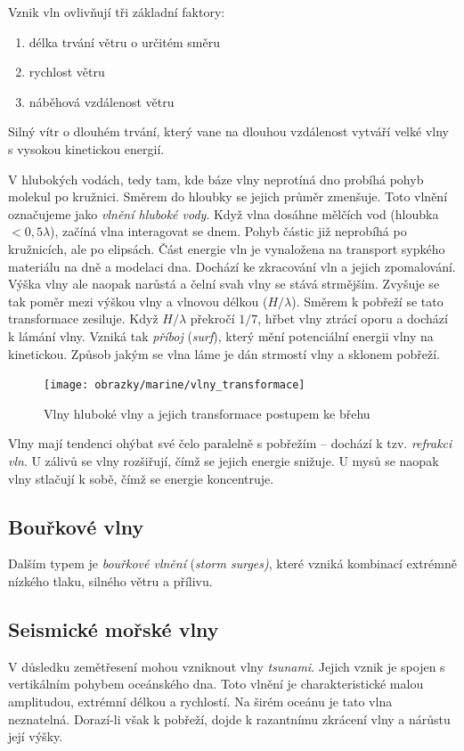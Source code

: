 Vznik vln ovlivňují tři základní faktory:
\begin{enumerate}
	\item délka trvání větru o určitém směru
	\item rychlost větru
	\item náběhová vzdálenost větru
\end{enumerate}

Silný vítr o dlouhém trvání, který vane na dlouhou vzdálenost vytváří velké vlny s vysokou kinetickou energií. 

V hlubokých vodách, tedy tam, kde báze vlny neprotíná dno probíhá pohyb molekul po kružnici. Směrem do hloubky se jejich průměr zmenšuje. Toto vlnění označujeme jako \emph{vlnění hluboké vody}. Když vlna dosáhne mělčích vod (hloubka $< 0,5\lambda$), začíná vlna interagovat se dnem. Pohyb částic již neprobíhá po kružnicích, ale po elipsách. Část energie vln je vynaložena na transport sypkého materiálu na dně a modelaci dna. Dochází ke zkracování vln a jejich zpomalování. Výška vlny ale naopak narůstá a čelní svah vlny se stává strmějším. Zvyšuje se tak poměr mezi výškou vlny a vlnovou délkou ($H/\lambda$). Směrem k pobřeží se tato transformace zesiluje. Když $H/\lambda$ překročí $1/7$, hřbet vlny ztrácí oporu a dochází k lámání vlny. Vzniká tak \emph{příboj} (\textit{surf}), který mění potenciální energii vlny na kinetickou. Způsob jakým se vlna láme je dán strmostí vlny a sklonem pobřeží.

\begin{figure}[h]
	\centering
	\texttt{[image: obrazky/marine/vlny\_transformace]}
	\caption{Vlny hluboké vlny a jejich transformace postupem ke břehu}
	\label{fig:vlnytransformace}
\end{figure}

Vlny mají tendenci ohýbat své čelo paralelně s pobřežím -- dochází k tzv. \emph{refrakci vln}. U zálivů se vlny rozšiřují, čímž se jejich energie snižuje. U mysů se naopak vlny stlačují k sobě, čímž se energie koncentruje.
\subsection{Bouřkové vlny}
Dalším typem je \emph{bouřkové vlnění} (\textit{storm surges)}, které vzniká kombinací extrémně nízkého tlaku, silného větru a přílivu. 
 
\subsection{Seismické mořské vlny}
V důsledku zemětřesení mohou vzniknout vlny \emph{tsunami}. Jejich vznik je spojen s vertikálním pohybem oceánského dna. Toto vlnění je charakteristické malou amplitudou, extrémní délkou a rychlostí. Na širém oceánu je tato vlna neznatelná. Dorazí-li však k pobřeží, dojde k razantnímu zkrácení vlny a nárůstu její výšky. 

